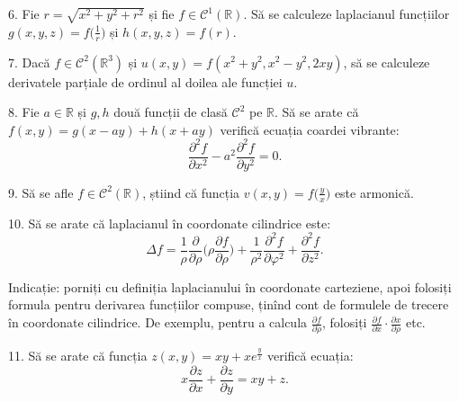 \documentclass[11pt,a4paper]{article}
\newcommand\kal{\mathcal}
\newcommand\RR{\mathbb{R}}
\theoremstyle{dotless}
\theoremstyle{dotlessdr}
\begin{document}
\vspace{1cm}

6. Fie $r = \sqrt{x^2 + y^2 + r^2}$ și fie $f \in \kal{C}^1(\RR)$. Să se calculeze laplacianul
funcțiilor $g(x, y, z) = f \big( \frac{1}{r} \big)$ și $h(x, y, z) = f(r)$.

\vspace{1cm}

7. Dacă $f \in \kal{C}^2(\RR^3)$ și $u(x, y) = f(x^2 + y^2, x^2 - y^2, 2xy)$, să se calculeze
derivatele parțiale de ordinul al doilea ale funcției $u$.

\vspace{1cm}

8. Fie $a \in \RR$ și $g, h$ două funcții de clasă $\kal{C}^2$ pe $\RR$. Să se arate că
$f(x, y) = g(x - ay) + h(x + ay)$ verifică ecuația coardei vibrante:
\[
  \frac{\partial^2 f}{\partial x^2} - a^2 \frac{\partial^2 f}{\partial y^2} = 0.
\]

\vspace{1cm}

9. Să se afle $f \in \kal{C}^2(\RR)$, știind că funcția $v(x, y) = f\big(\frac{y}{x}\big)$
este armonică.

\vspace{1cm}

10. Să se arate că laplacianul în coordonate cilindrice este:
\[
  \Delta f = \frac{1}{\rho} \frac{\partial}{\partial \rho} %
  \Big(\rho \frac{\partial f}{\partial \rho} \Big) + %
  \frac{1}{\rho^2} \frac{\partial^2 f}{\partial \varphi^2} + %
  \frac{\partial^2 f}{\partial z^2}.
\]

Indicație: porniți cu definiția laplacianului în coordonate carteziene, apoi
folosiți formula pentru derivarea funcțiilor compuse, ținînd cont de formulele
de trecere în coordonate cilindrice. De exemplu, pentru a calcula
$\frac{\partial f}{\partial \rho}$, folosiți
$\frac{\partial f}{\partial x} \cdot \frac{\partial x}{\partial \rho}$ etc.

\vspace{1cm}

11. Să se arate că funcția $z(x, y) = xy + xe^{\frac{y}{x}}$ verifică ecuația:
\[
  x \frac{\partial z}{\partial x} + \frac{\partial z}{\partial y} = xy + z.
\]
\end{document}
